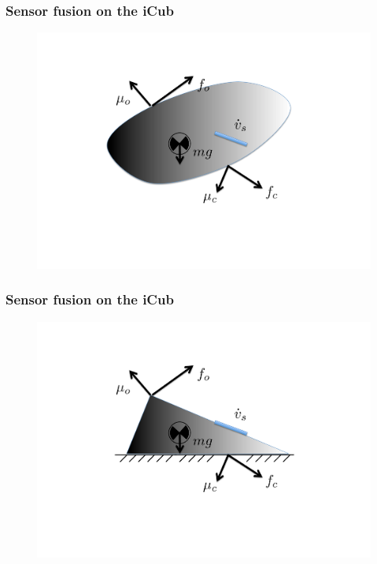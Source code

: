 \documentclass[xcolor=dvipsnames]{beamer}
\begin{document}
\begin{frame}
  \frametitle{Sensor fusion on the iCub}
\begin{figure} 
  \centering 
	  \includegraphics[height=0.55\hsize]{images/pdf/rigidBody.pdf} 
\end{figure}
\end{frame}

\begin{frame}
  \frametitle{Sensor fusion on the iCub}
\begin{figure} 
  \centering 
	  \includegraphics[height=0.55\hsize]{images/pdf/foot.pdf} 
\end{figure}
\end{frame}
\end{document}
